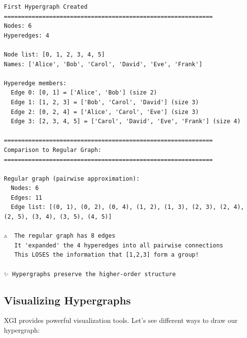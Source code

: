 \documentclass[
  11pt,
  letterpaper,
  oneside,
  openany]{book}
\begin{document}
\begin{verbatim}
First Hypergraph Created
============================================================
Nodes: 6
Hyperedges: 4

Node list: [0, 1, 2, 3, 4, 5]
Names: ['Alice', 'Bob', 'Carol', 'David', 'Eve', 'Frank']

Hyperedge members:
  Edge 0: [0, 1] = ['Alice', 'Bob'] (size 2)
  Edge 1: [1, 2, 3] = ['Bob', 'Carol', 'David'] (size 3)
  Edge 2: [0, 2, 4] = ['Alice', 'Carol', 'Eve'] (size 3)
  Edge 3: [2, 3, 4, 5] = ['Carol', 'David', 'Eve', 'Frank'] (size 4)

============================================================
Comparison to Regular Graph:
============================================================

Regular graph (pairwise approximation):
  Nodes: 6
  Edges: 11
  Edge list: [(0, 1), (0, 2), (0, 4), (1, 2), (1, 3), (2, 3), (2, 4), (2, 5), (3, 4), (3, 5), (4, 5)]

⚠️  The regular graph has 8 edges
   It 'expanded' the 4 hyperedges into all pairwise connections
   This LOSES the information that [1,2,3] form a group!

✨ Hypergraphs preserve the higher-order structure
\end{verbatim}

\subsection{Visualizing Hypergraphs}\label{visualizing-hypergraphs}

XGI provides powerful visualization tools. Let's see different ways to
draw our hypergraph:
\end{document}
